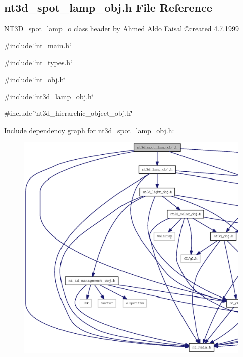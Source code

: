 \subsection{nt3d\_\-spot\_\-lamp\_\-obj.h File Reference}
\label{nt3d__spot__lamp__obj_8h}



\begin{DoxyItemize}
\item \hyperlink{class_n_t3_d__spot__lamp__o}{NT3D\_\-spot\_\-lamp\_\-o} class header by Ahmed Aldo Faisal \copyright created 4.7.1999 
\end{DoxyItemize} 


{\ttfamily \#include \char`\"{}nt\_\-main.h\char`\"{}}\par
{\ttfamily \#include \char`\"{}nt\_\-types.h\char`\"{}}\par
{\ttfamily \#include \char`\"{}nt\_\-obj.h\char`\"{}}\par
{\ttfamily \#include \char`\"{}nt3d\_\-lamp\_\-obj.h\char`\"{}}\par
{\ttfamily \#include \char`\"{}nt3d\_\-hierarchic\_\-object\_\-obj.h\char`\"{}}\par
Include dependency graph for nt3d\_\-spot\_\-lamp\_\-obj.h:
\nopagebreak
\begin{figure}[H]
\begin{center}
\leavevmode
\includegraphics[width=400pt]{nt3d__spot__lamp__obj_8h__incl}
\end{center}
\end{figure}
